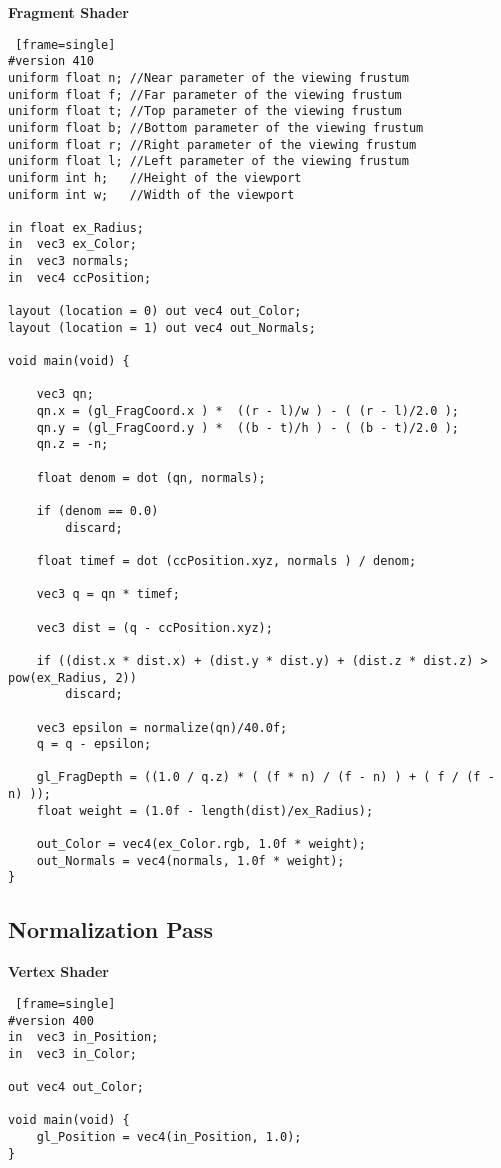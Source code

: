 \textbf{Fragment Shader}
\begin{lstlisting} [frame=single]
#version 410
uniform float n; //Near parameter of the viewing frustum
uniform float f; //Far parameter of the viewing frustum
uniform float t; //Top parameter of the viewing frustum
uniform float b; //Bottom parameter of the viewing frustum
uniform float r; //Right parameter of the viewing frustum
uniform float l; //Left parameter of the viewing frustum
uniform int h; 	 //Height of the viewport
uniform int w; 	 //Width of the viewport

in float ex_Radius;
in  vec3 ex_Color;
in  vec3 normals;
in 	vec4 ccPosition;

layout (location = 0) out vec4 out_Color;
layout (location = 1) out vec4 out_Normals;

void main(void) {

	vec3 qn;
	qn.x = (gl_FragCoord.x ) *  ((r - l)/w ) - ( (r - l)/2.0 );
	qn.y = (gl_FragCoord.y ) *  ((b - t)/h ) - ( (b - t)/2.0 );
	qn.z = -n;

	float denom = dot (qn, normals);

	if (denom == 0.0)
		discard;

	float timef = dot (ccPosition.xyz, normals ) / denom;

	vec3 q = qn * timef;

	vec3 dist = (q - ccPosition.xyz);

	if ((dist.x * dist.x) + (dist.y * dist.y) + (dist.z * dist.z) > pow(ex_Radius, 2))
		discard;

	vec3 epsilon = normalize(qn)/40.0f;
	q = q - epsilon;

	gl_FragDepth = ((1.0 / q.z) * ( (f * n) / (f - n) ) + ( f / (f - n) ));
	float weight = (1.0f - length(dist)/ex_Radius);

	out_Color = vec4(ex_Color.rgb, 1.0f * weight); 
	out_Normals = vec4(normals, 1.0f * weight);
}
\end{lstlisting}
\newpage

\subsection{Normalization Pass}
\textbf{Vertex Shader}
\begin{lstlisting} [frame=single]
#version 400
in  vec3 in_Position;
in 	vec3 in_Color;

out vec4 out_Color;

void main(void) {
	gl_Position = vec4(in_Position, 1.0);
}
\end{lstlisting}


